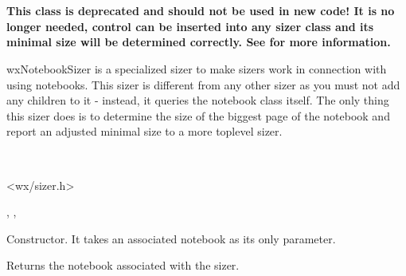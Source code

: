 \section{}\label{wxnotebooksizer}

{\bf This class is deprecated and should not be used in new code! It is no
longer needed,  control can be inserted
into any sizer class and its minimal size will be determined correctly.
See  for more information.}

wxNotebookSizer is a specialized sizer to make sizers work in connection
with using notebooks. This sizer is different from any other sizer as 
you must not add any children to it - instead, it queries the notebook class itself.
The only thing this sizer does is to determine the size of the biggest
page of the notebook and report an adjusted minimal size to a more toplevel
sizer.


\\


<wx/sizer.h>


, , 


\label{wxnotebooksizerwxnotebooksizer}


Constructor. It takes an associated notebook as its only parameter.

\label{wxnotebooksizergetnotebook}


Returns the notebook associated with the sizer.

